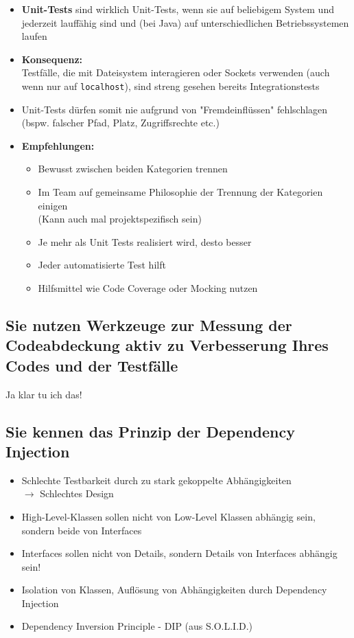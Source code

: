 \documentclass[a4paper]{article}
\begin{document}
			\begin{itemize}
				\item \textbf{Unit-Tests} sind wirklich Unit-Tests, wenn sie auf beliebigem System und jederzeit lauffähig sind und (bei Java) auf unterschiedlichen Betriebssystemen laufen
				
				\item \textbf{Konsequenz:}\\
				Testfälle, die mit Dateisystem interagieren oder Sockets verwenden (auch wenn nur auf \texttt{localhost}), sind streng gesehen bereits Integrationstests
				
				\item Unit-Tests dürfen somit nie aufgrund von "Fremdeinflüssen" fehlschlagen\\
				(bspw. falscher Pfad, Platz, Zugriffsrechte etc.)
				
				\item \textbf{Empfehlungen:}
					\begin{itemize}
						\item Bewusst zwischen beiden Kategorien trennen
						\item Im Team auf gemeinsame Philosophie der Trennung der Kategorien einigen\\
						(Kann auch mal projektspezifisch sein)
						\item Je mehr als Unit Tests realisiert wird, desto besser
						\item Jeder automatisierte Test hilft
						\item Hilfsmittel wie Code Coverage oder Mocking nutzen
					\end{itemize}
			\end{itemize}
		
		
		\subsection{Sie nutzen Werkzeuge zur Messung der Codeabdeckung aktiv zu Verbesserung Ihres Codes und der Testfälle}
		
		Ja klar tu ich das!
		
		\newpage
		\subsection{Sie kennen das Prinzip der Dependency Injection}
		
		\begin{itemize}
			\item Schlechte Testbarkeit durch zu stark gekoppelte Abhängigkeiten\\
					$\rightarrow$ Schlechtes Design
			\item High-Level-Klassen sollen nicht von Low-Level Klassen abhängig sein, \\
			sondern beide von Interfaces
			\item Interfaces sollen nicht von Details, sondern Details von Interfaces abhängig sein!
			\item Isolation von Klassen, Auflösung von Abhängigkeiten durch Dependency Injection
			\item Dependency Inversion Principle - DIP (aus S.O.L.I.D.)
		\end{itemize}
	
\end{document}
